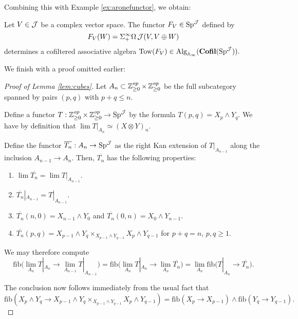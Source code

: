 Combining this with Example \ref{ex:aronefunctor}, we obtain:

\begin{cor}\label{cor:aronemonoidal}
Let $V\in \operatorname{\mathcal{J}}$ be a complex vector space.  
The functor $F_V\in \operatorname{\mathrm{Sp}}^{\operatorname{\mathcal{J}}}$ defined by $$F_V(W) = \Sigma^{\infty}_+ \Omega \operatorname{\mathcal{J}}(V, V\oplus W)$$ determines a cofiltered associative algebra $\mathrm{Tow}(F_V) \in \operatorname{\mathrm{Alg}}_{\mathbb{A}_{\infty}}(\operatorname{\mathbf{Cofil}}(\operatorname{\mathrm{Sp}}^{\operatorname{\mathcal{J}}})).$
\end{cor}


We finish with a proof omitted earlier:
\begin{proof}[Proof of Lemma \ref{lem:cubes}]
Let $A_n\subset \operatorname{\mathbb{Z}}^{op}_{\geq 0} \times \operatorname{\mathbb{Z}}^{op}_{\geq 0} $ be the full subcategory spanned by pairs $(p,q)$ with $p+q \leq n$.  

Define a functor $T:\operatorname{\mathbb{Z}}^{op}_{\geq 0} \times \operatorname{\mathbb{Z}}^{op}_{\geq 0}  \to \operatorname{\mathrm{Sp}}^{\operatorname{\mathcal{J}}}$ by the formula $T(p,q) = X_p \wedge Y_q.$  We have by definition that $\lim T|_{A_n} \simeq (X\otimes Y)_{n}$.%

Define the functor $\overline{T_n}: A_n \to \operatorname{\mathrm{Sp}}^{\operatorname{\mathcal{J}}}$ as the right Kan extension of $T|_{A_{n-1}}$ along the inclusion $A_{n-1} \to A_{n}.$   Then, $\overline{T_n}$ has the following properties:
\begin{enumerate}
\item $\lim \overline{T_n} = \lim T|_{A_{n-1}}.$
\item $\overline{T_n}|_{A_{n-1}} = T|_{A_{n-1}}.$
\item $\overline{T_n}(n,0) = X_{n-1} \wedge Y_0$ and $\overline{T_n}(0,n) = X_0\wedge Y_{n-1}.$
\item $\overline{T_n}(p,q) = X_{p-1}\wedge Y_{q} \times_{X_{p-1}\wedge Y_{q-1}} X_p\wedge Y_{q-1}$ for $p+q=n$, $p,q\geq 1$.  
\end{enumerate}

We may therefore compute $$\text{fib}\big(\lim_{A_n} T|_{A_n} \to \lim_{A_{n-1}} T|_{A_{n-1}}\big) = \text{fib}\big(\lim_{A_n} T|_{A_n} \to \lim_{A_n} \overline{T_n}\big) = \lim_{A_n} \text{fib}\big(T|_{A_n} \to \overline{T_n}\big).$$

The conclusion now follows immediately from the usual fact that $$\text{fib}(X_p\wedge Y_q \to X_{p-1}\wedge Y_{q} \times_{X_{p-1}\wedge Y_{q-1}} X_p\wedge Y_{q-1}) = \text{fib}(X_p\to X_{p-1}) \wedge \text{fib}(Y_q \to Y_{q-1}).$$
\end{proof}

